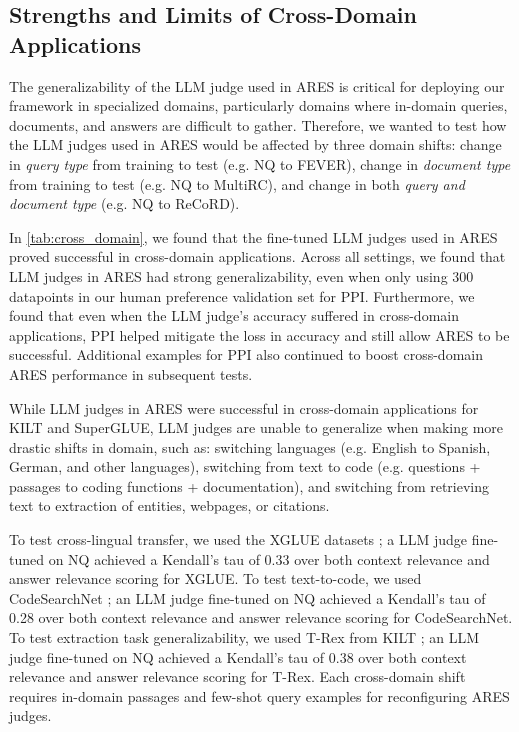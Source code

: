 \subsection{Strengths and Limits of Cross-Domain Applications}

The generalizability of the LLM judge used in ARES is critical for deploying our framework in specialized domains, particularly domains where in-domain queries, documents, and answers are difficult to gather.
Therefore, we wanted to test how the LLM judges used in ARES would be affected by three domain shifts: change in \textit{query type} from training to test (e.g. NQ to FEVER), change in \textit{document type} from training to test (e.g. NQ to MultiRC), and change in both \textit{query and document type} (e.g. NQ to ReCoRD).





In \autoref{tab:cross_domain}, we found that the fine-tuned LLM judges used in ARES proved successful in cross-domain applications. 
Across all settings, we found that LLM judges in ARES had strong generalizability, even when only using 300 datapoints in our human preference validation set for PPI.
Furthermore, we found that even when the LLM judge's accuracy suffered in cross-domain applications, PPI helped mitigate the loss in accuracy and still allow ARES to be successful.
Additional examples for PPI also continued to boost cross-domain ARES performance in subsequent tests.

While LLM judges in ARES were successful in cross-domain applications for KILT and SuperGLUE, LLM judges are unable to generalize when making more drastic shifts in domain, such as: switching languages (e.g. English to Spanish, German, and other languages), switching from text to code (e.g. questions + passages to coding functions + documentation), and switching from retrieving text to extraction of entities, webpages, or citations.


To test cross-lingual transfer, we used the XGLUE datasets \cite{Liang2020XGLUEAN}; a LLM judge fine-tuned on NQ achieved a Kendall's tau of 0.33 over both context relevance and answer relevance scoring for XGLUE.
To test text-to-code, we used CodeSearchNet \cite{husain2019codesearchnet}; an LLM judge fine-tuned on NQ achieved a Kendall's tau of 0.28 over both context relevance and answer relevance scoring for CodeSearchNet.
To test extraction task generalizability, we used T-Rex from KILT \cite{elsahar2018t, petroni-etal-2021-kilt}; an LLM judge fine-tuned on NQ achieved a Kendall's tau of 0.38 over both context relevance and answer relevance scoring for T-Rex.
Each cross-domain shift requires in-domain passages and few-shot query examples for reconfiguring ARES judges. 






